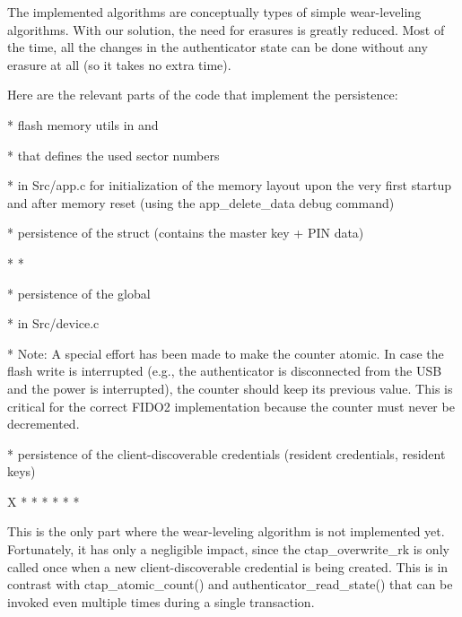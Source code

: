 The implemented algorithms are conceptually types of {\sbf simple wear-leveling algorithms}. With our solution, the need for erasures is greatly reduced. Most of the time, all the changes in the authenticator state can be done without any erasure at all (so it takes no extra time).

Here are the relevant parts of the code that implement the persistence:

\begitems

* flash memory utils in  and 

*  that defines the used sector numbers

*  in Src/app.c for initialization of the memory layout upon the very first startup and after memory reset (using the app_delete_data debug command)

* persistence of the  struct (contains the master key + PIN data)

\begitems
* 
* 
\enditems

* persistence of the global 

\begitems

*  in Src/device.c

* Note: A special effort has been made to make the counter atomic. In case the flash write is interrupted (e.g., the authenticator is disconnected from the USB and the power is interrupted), the counter should keep its previous value. This is critical for the correct FIDO2 implementation because the counter must never be decremented.

\enditems

* persistence of the client-discoverable credentials (resident credentials, resident keys)

\begitems \style X
* 
* 
* 
* 
* 
* 

This is the only part where the wear-leveling algorithm is not implemented yet.
Fortunately, it has only a negligible impact, since the ctap_overwrite_rk is only called once when a new client-discoverable credential is being created. This is in contrast with ctap_atomic_count() and authenticator_read_state() that can be invoked even multiple times during a single transaction.

\enditems

\enditems





